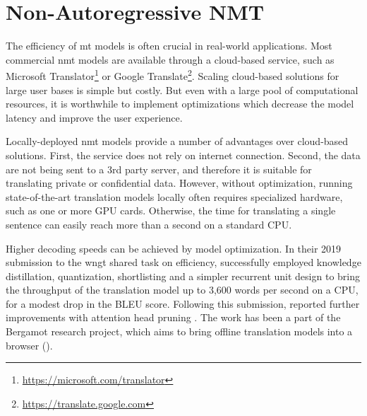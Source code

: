 \chapter{Non-Autoregressive NMT}
\label{chap:nat}

The efficiency of \gls{mt} models is often crucial in real-world applications.
Most commercial \gls{nmt} models are available through a cloud-based service,
such as Microsoft Translator\footnote{\url{https://microsoft.com/translator}}
or Google Translate\footnote{\url{https://translate.google.com}}. Scaling
cloud-based solutions for large user bases is simple but costly. But even with
a large pool of computational resources, it is worthwhile to implement
optimizations which decrease the model latency and improve the user experience.


Locally-deployed \gls{nmt} models provide a number of advantages over
cloud-based solutions. First, the service does not rely on internet
connection. Second, the data are not being sent to a 3rd party server, and
therefore it is suitable for translating private or confidential data.
However, without optimization, running state-of-the-art translation models
locally often requires specialized hardware, such as one or more GPU
cards. Otherwise, the time for translating a single sentence can easily reach
more than a second on a standard CPU.

Higher decoding speeds can be achieved by model optimization. In their 2019
submission to the \gls{wngt} shared task on efficiency,
\citet{kim-etal-2019-research} successfully employed knowledge distillation,
quantization, shortlisting \citep{jean2015using} and a simpler recurrent unit
design to bring the throughput of the translation model up to 3,600 words per
second on a CPU, for a modest drop in the BLEU score. Following this
submission, \citet{bogoychev-etal-2020-edinburghs} reported further
improvements with attention head pruning \citep{voita-etal-2019-analyzing}. The
work has been a part of the Bergamot research project, which aims to bring
offline translation models into a browser ().


